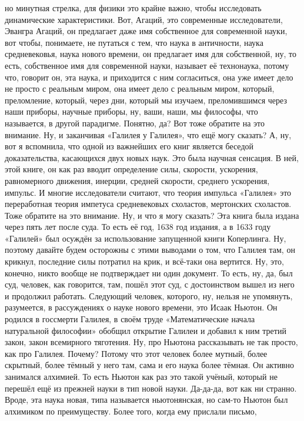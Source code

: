 но минутная стрелка, для физики это крайне важно, чтобы исследовать динамические
характеристики. Вот, Агаций, это современные исследователи, Эвангра Агаций, он
предлагает даже имя собственное для современной науки, вот чтобы, понимаете, не
путаться с тем, что наука в античности, наука средневековья, наука нового
времени, он предлагает имя для собственной, ну, то есть, собственное имя для
современной науки, называет её технонаука, потому что, говорит он, эта наука, и
приходится с ним согласиться, она уже имеет дело не просто с реальным миром, она
имеет дело с реальным миром, который, преломление, который, через дни, который
мы изучаем, преломившимся через наши приборы, научные приборы, ну, ваши, наши,
мы философы, что называется, в другой парадигме. Понятно, да? Вот тоже обратите
на это внимание. Ну, и заканчивая «Галилея у Галилея», что ещё могу сказать? А,
ну, вот я вспомнила, что одной из важнейших его книг является беседой
доказательства, касающихся двух новых наук. Это была научная сенсация. В ней,
этой книге, он как раз вводит определение силы, скорости, ускорения,
равномерного движения, инерции, средней скорости, среднего ускорения, импульс. И
многие исследователи считают, что теория импульса «Галилея» это переработная
теория импетуса средневековых схоластов, мертонских схоластов. Тоже обратите на
это внимание. Ну, и что я могу сказать? Эта книга была издана через пять лет
после суда. То есть её год, 1638 год издания, а в 1633 году «Галилей» был
осуждён за использование запущенной книги Коперлинга. Ну, поэтому давайте будем
осторожны с этими выводами о том, что Галилея там, он крикнул, последние силы
потратил на крик, и всё-таки она вертится. Ну, это, конечно, никто вообще не
подтверждает ни один документ. То есть, ну, да, был суд, человек, как говорится,
там, пошёл этот суд, с достоинством вышел из него и продолжил работать.
Следующий человек, которого, ну, нельзя не упомянуть, разумеется, в рассуждениях
о науке нового времени, это Исаак Ньютон. Он родился в госсмерти Галилея, в
своём труде «Математические начала натуральной философии» обобщил открытие
Галилеи и добавил к ним третий закон, закон всемирного тяготения. Ну, про
Ньютона рассказывать не так просто, как про Галилея. Почему? Потому что этот
человек более мутный, более скрытный, более тёмный у него там, сама и его наука
более тёмная. Он активно занимался алхимией. То есть Ньютон как раз это такой
учёный, который не перешёл ещё из прежней науки в тип новой науки. Да-да-да, вот
как ни странно. Вроде, эта наука новая, типа называется ньютонянская, но сам-то
Ньютон был алхимиком по преимуществу. Более того, когда ему прислали письмо,

